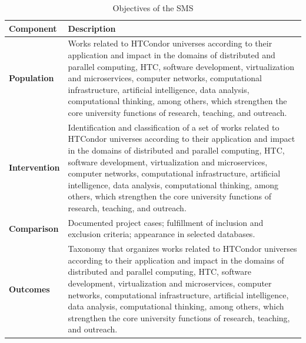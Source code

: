 \begin{table}[htbp]
	\centering
	\caption{Objectives of the SMS}
	\label{table:PICOC}
	\renewcommand{\arraystretch}{1}  %
	\begin{tabular}{p{1.4cm}p{6.4cm}}
		\toprule
		\textbf{Component}    & \textbf{Description}                                                                                                                                                                                                                                                                                                                                                                                                                                              \\
		\midrule
		\textbf{Population}   & Works related to HTCondor universes according to their application and impact in the domains of distributed and parallel computing, HTC, software development, virtualization and microservices, computer networks, computational infrastructure, artificial intelligence, data analysis, computational thinking, among others, which strengthen the core university functions of research, teaching, and outreach.                                               \\
		\addlinespace[0.8em]
		\textbf{Intervention} & Identification and classification of a set of works related to HTCondor universes according to their application and impact in the domains of distributed and parallel computing, HTC, software development, virtualization and microservices, computer networks, computational infrastructure, artificial intelligence, data analysis, computational thinking, among others, which strengthen the core university functions of research, teaching, and outreach. \\
		\addlinespace[0.8em]
		\textbf{Comparison}   & Documented project cases; fulfillment of inclusion and exclusion criteria; appearance in selected databases.                                                                                                                                                                                                                                                                                                                                                      \\
		\addlinespace[0.8em]
		\textbf{Outcomes}     & Taxonomy that organizes works related to HTCondor universes according to their application and impact in the domains of distributed and parallel computing, HTC, software development, virtualization and microservices, computer networks, computational infrastructure, artificial intelligence, data analysis, computational thinking, among others, which strengthen the core university functions of research, teaching, and outreach.                       \\

\end{tabular}
\end{table}
